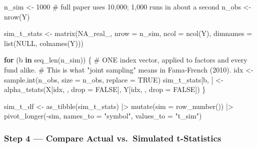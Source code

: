 \documentclass[
  letterpaper,
  DIV=11,
  numbers=noendperiod]{scrartcl}
\newenvironment{Shaded}{\begin{snugshade}}{\end{snugshade}}
\newcommand{\AttributeTok}[1]{\textcolor[rgb]{0.40,0.45,0.13}{#1}}
\newcommand{\CommentTok}[1]{\textcolor[rgb]{0.37,0.37,0.37}{#1}}
\newcommand{\ConstantTok}[1]{\textcolor[rgb]{0.56,0.35,0.01}{#1}}
\newcommand{\ControlFlowTok}[1]{\textcolor[rgb]{0.00,0.23,0.31}{\textbf{#1}}}
\newcommand{\DecValTok}[1]{\textcolor[rgb]{0.68,0.00,0.00}{#1}}
\newcommand{\FunctionTok}[1]{\textcolor[rgb]{0.28,0.35,0.67}{#1}}
\newcommand{\NormalTok}[1]{\textcolor[rgb]{0.00,0.23,0.31}{#1}}
\newcommand{\OtherTok}[1]{\textcolor[rgb]{0.00,0.23,0.31}{#1}}
\newcommand{\SpecialCharTok}[1]{\textcolor[rgb]{0.37,0.37,0.37}{#1}}
\newcommand{\StringTok}[1]{\textcolor[rgb]{0.13,0.47,0.30}{#1}}
\begin{document}
\begin{Shaded}
\begin{Highlighting}[]
\NormalTok{n\_sim }\OtherTok{\textless{}{-}} \DecValTok{1000}        \CommentTok{\# full paper uses 10,000; 1,000 runs in about a second}
\NormalTok{n\_obs }\OtherTok{\textless{}{-}} \FunctionTok{nrow}\NormalTok{(Y)}

\NormalTok{sim\_t\_stats }\OtherTok{\textless{}{-}} \FunctionTok{matrix}\NormalTok{(}\ConstantTok{NA\_real\_}\NormalTok{, }\AttributeTok{nrow =}\NormalTok{ n\_sim, }\AttributeTok{ncol =} \FunctionTok{ncol}\NormalTok{(Y),}
                      \AttributeTok{dimnames =} \FunctionTok{list}\NormalTok{(}\ConstantTok{NULL}\NormalTok{, }\FunctionTok{colnames}\NormalTok{(Y)))}

\ControlFlowTok{for}\NormalTok{ (b }\ControlFlowTok{in} \FunctionTok{seq\_len}\NormalTok{(n\_sim)) \{}
  \CommentTok{\# ONE index vector, applied to factors and every fund alike.}
  \CommentTok{\# This is what "joint sampling" means in Fama{-}French (2010).}
\NormalTok{  idx }\OtherTok{\textless{}{-}} \FunctionTok{sample.int}\NormalTok{(n\_obs, }\AttributeTok{size =}\NormalTok{ n\_obs, }\AttributeTok{replace =} \ConstantTok{TRUE}\NormalTok{)}
\NormalTok{  sim\_t\_stats[b, ] }\OtherTok{\textless{}{-}} \FunctionTok{alpha\_tstats}\NormalTok{(X[idx, , }\AttributeTok{drop =} \ConstantTok{FALSE}\NormalTok{],}
\NormalTok{                                   Y[idx, , }\AttributeTok{drop =} \ConstantTok{FALSE}\NormalTok{])}
\NormalTok{\}}

\NormalTok{sim\_t\_df }\OtherTok{\textless{}{-}} \FunctionTok{as\_tibble}\NormalTok{(sim\_t\_stats) }\SpecialCharTok{|\textgreater{}}
  \FunctionTok{mutate}\NormalTok{(}\AttributeTok{sim =} \FunctionTok{row\_number}\NormalTok{()) }\SpecialCharTok{|\textgreater{}}
  \FunctionTok{pivot\_longer}\NormalTok{(}\SpecialCharTok{{-}}\NormalTok{sim, }\AttributeTok{names\_to =} \StringTok{"symbol"}\NormalTok{, }\AttributeTok{values\_to =} \StringTok{"t\_sim"}\NormalTok{)}
\end{Highlighting}
\end{Shaded}

\subsubsection{Step 4 --- Compare Actual vs.~Simulated
t-Statistics}\label{step-4-compare-actual-vs.-simulated-t-statistics}
\end{document}
